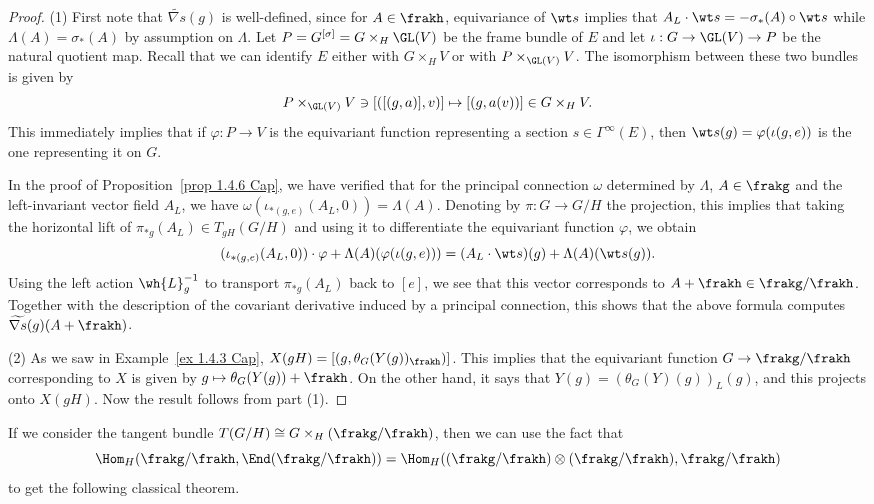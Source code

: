 \begin{proof}
    (1) First note that $\widetilde{\nabla s}(g)$ is well-defined, since for $A\in\frakh$, equivariance of $\wt s$ implies that $A_L\cdot \wt s=-\sigma_\ast(A)\circ \wt s$ while $\Lambda(A)=\sigma_\ast(A)$ by assumption on $\Lambda$. Let $P=G^{[\sigma]}=G\times_H \GL(V)$ be the frame bundle of $E$ and let $\iota:G\to \GL(V)\to P$ be the natural quotient map. Recall that we can identify $E$ either with $G\times_H V$ or with $P\times_{\GL(V)}V$. The isomorphism between these two bundles is given by 
    \[P\times_{\GL(V)} V\ni [([(g,a)],v)]\mapsto [(g,a(v))]\in G\times_H V.\]
    This immediately implies that if $\varphi:P\to V$ is the equivariant function representing a section $s\in\Gamma^\infty(E)$, then $\wt s(g)=\varphi(\iota(g,e))$ is the one representing it on $G$.

    In the proof of Proposition~\ref{prop 1.4.6 Cap}, we have verified that for the principal connection $\omega$ determined by $\Lambda$, $A\in\frakg$  and the left-invariant vector field $A_L$, we have $\omega(\iota_{\ast(g,e)}(A_L,0))=\Lambda(A)$. Denoting by $\pi:G\to G\slash H$ the projection, this implies that taking the horizontal lift of $\pi_{\ast g}(A_L)\in T_{gH}(G\slash H)$ and using it to differentiate the equivariant function $\varphi$, we obtain 
    \[(\iota_{\ast(g,e)}(A_L,0))\cdot\varphi+\Lambda(A)(\varphi(\iota(g,e)))=(A_L\cdot \wt s)(g)+\Lambda(A)(\wt s(g)).\]
    Using the left action $\wh{L}_g^{-1}$ to transport $\pi_{\ast g}(A_L)$ back to $[e]$, we see that this vector corresponds to $A+\frakh\in\frakg\slash\frakh$. Together with the description of the covariant derivative induced by a principal connection, this shows that the above formula computes $\widetilde{\nabla s}(g)(A+\frakh)$.

    (2) As we saw in Example~\ref{ex 1.4.3 Cap}, $X(gH)=[(g,\theta_G(Y(g))_\frakh)]$. This implies that the equivariant function $G\to \frakg\slash \frakh$ corresponding to $X$ is given by $g\mapsto \theta_G(Y(g))+\frakh$. On the other hand, it says that $Y(g)=(\theta_G(Y)(g))_L(g)$, and this projects onto $X(gH)$. Now the result follows from part (1).
\end{proof}

If we consider the tangent bundle $T(G\slash H)\cong G\times_{H}(\frakg\slash\frakh)$,  then we can use the fact that 
\[\Hom_H(\frakg\slash\frakh,\End(\frakg\slash\frakh))=\Hom_H((\frakg\slash\frakh)\otimes (\frakg\slash\frakh),\frakg\slash\frakh)\]
to get the following classical theorem.

